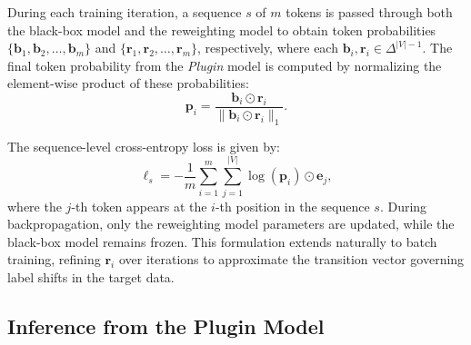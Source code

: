 

During each training iteration, a sequence $s$ of $m$ tokens is passed through both the black-box model and the reweighting model to obtain token probabilities $\{\bm{b}_1, \bm{b}_2, \dots, \bm{b}_m\}$ and $\{\bm{r}_1, \bm{r}_2, \dots, \bm{r}_m\}$, respectively, where each $\bm{b}_i, \bm{r}_i \in \Delta^{|V|-1}$. The final token probability from the \textit{Plugin} model is computed by normalizing the element-wise product of these probabilities:
\begin{equation}
    \label{eq:final_prob}
    {\bm{p}}_i = \frac{\bm{b}_i \odot \bm{r}_i}{\|\bm{b}_i \odot \bm{r}_i\|_1}.
\end{equation}

The sequence-level cross-entropy loss is given by:
\begin{equation}
    \label{eq:ce_batch_loss}
    \ell_s = -\frac{1}{m} \sum_{i=1}^{m} \sum_{j=1}^{|V|} \log({\bm{p}}_i) \odot \bm{e}_j,
\end{equation}
where the $j$-th token appears at the $i$-th position in the sequence $s$. During backpropagation, only the reweighting model parameters are updated, while the black-box model remains frozen. This formulation extends naturally to batch training, refining $\bm{r}_i$ over iterations to approximate the transition vector governing label shifts in the target data.



\subsection{Inference from the Plugin Model}
\label{ssec:inference}


